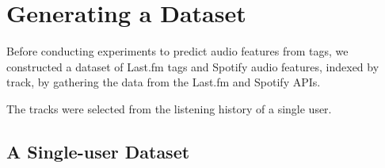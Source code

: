 \documentclass[sn-mathphys]{sn-jnl}%
\theoremstyle{thmstyleone}%
\theoremstyle{thmstyletwo}%
\theoremstyle{thmstylethree}%
\begin{document}





%

\section{Generating a Dataset}

Before conducting experiments to predict audio features from tags,
we constructed a dataset of Last.fm tags and Spotify audio features, indexed by track, by gathering the data from the Last.fm and Spotify APIs.

The tracks were selected from the listening history of a single user.

\subsection{A Single-user Dataset}
\end{document}
